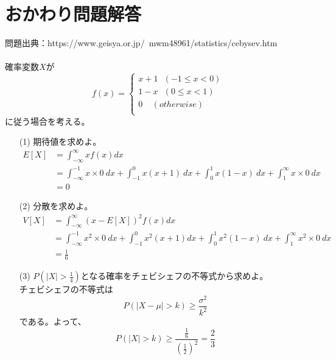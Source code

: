 \documentclass[a4j,uplatex,dvipdfmx]{jsarticle}
\begin{document}
\section*{おかわり問題解答}
問題出典：https://www.geisya.or.jp/~mwm48961/statistics/cebysev.htm \\
\\
確率変数$X$が
\begin{equation}
  f(x)=
 \begin{cases}
   x+1~~~(-1\le x<0)\\
   1-x~~~(0\le x<1)\\
   0~~~~~(otherwise)\\
 \end{cases}
\end{equation}
に従う場合を考える。
\begin{itemize}
  \item[(1)] 期待値を求めよ。
   \begin{equation}
     \begin{split}
       E[X] &= \int_{-\infty}^{\infty} x f(x) dx\\
       &= \int_{-\infty}^{-1} x\times 0\ dx + \int_{-1}^{0} x(x+1)\ dx + \int_{0}^{1} x(1-x)\ dx + \int_{1}^{\infty} x \times 0\ dx \\
       &= 0
     \end{split}
   \end{equation}
  \item[(2)] 分散を求めよ。
  \begin{equation}
    \begin{split}
      V[X] &= \int_{-\infty}^{\infty} (x-E[X])^2f(x) dx \\
      &=\int_{-\infty}^{-1} x^2\times 0\ dx + \int_{-1}^{0} x^2(x+1) dx + \int_{0}^{1} x^2(1-x)\ dx + \int_{1}^{\infty} x^2 \times 0\ dx \\
      &=\frac{1}{6}
    \end{split}
  \end{equation} 
  \item[(3)] $\displaystyle P(|X|>\frac{1}{4})$となる確率をチェビシェフの不等式から求めよ。\\
  チェビシェフの不等式は
  \begin{equation}
      P(|X-\mu|>k)\ge \frac{\sigma ^2}{k^2}
  \end{equation} 
  である。よって、
  \begin{equation}
    P(|X|>k)\ge \frac{\frac{1}{6}}{\left( \frac{1}{2} \right)^2} = \frac{2}{3}
  \end{equation}
\end{itemize}
\end{document}
